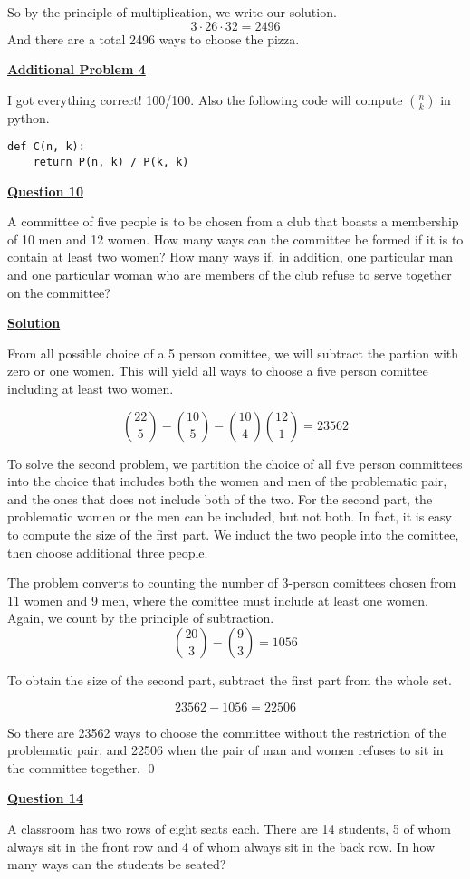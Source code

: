 \documentclass{article}
\newcommand{\new}[1]{
    \vspace{2mm}
    \noindent
    \textbf{
    \underline{#1}}
}
\newcommand{\m}{
    \cdot
}
\begin{document}
So by the principle of multiplication, we write our solution. 
\[
    3\m26\m32 = \boxed{2496}
\]
And there are a total 2496 ways to choose the pizza. 

\new{Additional Problem 4}
I got everything correct! 100/100. 
Also the following code will compute $\binom{n}{k}$ in python. 
\begin{verbatim}
def C(n, k):
    return P(n, k) / P(k, k)
\end{verbatim}

\new{Question 10}
A committee of five people is to be chosen from a club that boasts a membership 
of 10 men and 12 women. How many ways can the committee be formed if it is 
to contain at least two women? How many ways if, in addition, one particular 
man and one particular woman who are members of the club refuse to serve 
together on the committee?

\new{Solution}
\color{red}
From all possible choice of a 5 person comittee, we will 
subtract the partion with zero or one women. This will 
yield all ways to choose a five person comittee including at 
least two women. 

\[
    \binom{22}{5} - \binom{10}{5} - \binom{10}{4}\binom{12}{1}
    = \boxed{23562}
\]


To solve the second problem, we partition the choice of all five 
person committees into the choice that includes both the women and men 
of the problematic pair, and the ones that does not include both 
of the two. For the second part, the problematic women or the men 
can be included, but not both. In fact, it is easy to compute the size 
of the first part. We induct the two people into the comittee, then 
choose additional three people. 

The problem converts to counting the number of 3-person 
comittees chosen from 11 women and 9 men, where the comittee 
must include at least one women. Again, we count by the principle 
of subtraction. 
\[
    \binom{20}{3} - \binom{9}{3} = 1056
\]

To obtain the size of the second part, subtract the first part 
from the whole set. 

\[
    23562 - 1056 = \boxed{22506}
\]

So there are 23562 ways to choose the committee without the restriction 
of the problematic pair, and 22506 when the pair of man and women refuses 
to sit in the committee together. 
\color{black}
\hfill \qed

\new{Question 14}
A classroom has two rows of eight seats each. There are 14 students, 5 of whom 
always sit in the front row and 4 of whom always sit in the back row. In how 
many ways can the students be seated? 
\end{document}

